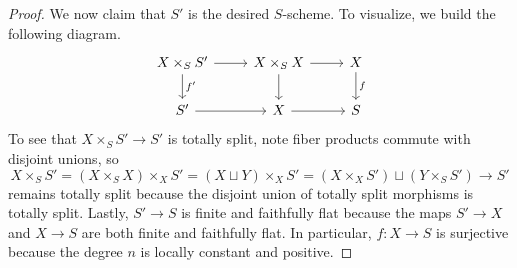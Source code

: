 \documentclass{amsart}
\begin{document}
\begin{proof}
    We now claim that $S'$ is the desired $S$-scheme. To visualize, we build the following diagram.
    \[\begin{tikzcd}
        {X\times_SS'} & {X\times_SX} & X \\
        {S'} & X & S
        \arrow["f", from=1-3, to=2-3]
        \arrow["{f'}", from=1-1, to=2-1]
        \arrow[from=1-2, to=2-2]
        \arrow[from=1-1, to=1-2]
        \arrow[from=1-2, to=1-3]
        \arrow[from=2-2, to=2-3]
        \arrow[from=2-1, to=2-2]
    \end{tikzcd}\]
    To see that $X\times_SS'\to S'$ is totally split, note fiber products commute with disjoint unions, so
    \[X\times_SS'=(X\times_SX)\times_XS'=(X\sqcup Y)\times_XS'=(X\times_XS')\sqcup(Y\times_SS')\to S'\]
    remains totally split because the disjoint union of totally split morphisms is totally split. Lastly, $S'\to S$ is finite and faithfully flat because the maps $S'\to X$ and $X\to S$ are both finite and faithfully flat. In particular, $f\colon X\to S$ is surjective because the degree $n$ is locally constant and positive.
\end{proof}
\end{document}
